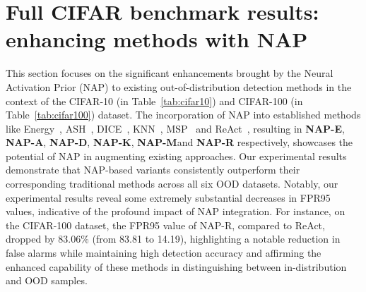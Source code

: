 \section{Full CIFAR benchmark results: enhancing methods with NAP}
\label{appendix:cifar}
This section focuses on the significant enhancements brought by the Neural Activation Prior (NAP) to existing out-of-distribution detection methods in the context of the CIFAR-10 (in Table~\ref{tab:cifar10}) and CIFAR-100 (in Table~\ref{tab:cifar100}) dataset. The incorporation of NAP into established methods like Energy~\cite{liu2020energy}, ASH~\cite{djurisic2022extremely}, DICE~\cite{sun2022dice}, KNN~\cite{sun2022knn}, MSP~\cite{hendrycks2016msp} and ReAct~\cite{sun2021react}, resulting in \textbf{NAP-E}, \textbf{NAP-A}, \textbf{NAP-D}, \textbf{NAP-K}, \textbf{NAP-M}and \textbf{NAP-R} respectively, showcases the potential of NAP in augmenting existing approaches.
Our experimental results demonstrate that NAP-based variants consistently outperform their corresponding traditional methods across all six OOD datasets. Notably, our experimental results reveal some extremely substantial decreases in FPR95 values, indicative of the profound impact of NAP integration. For instance, on the CIFAR-100 dataset, the FPR95 value of NAP-R, compared to ReAct, dropped by 83.06\% (from 83.81 to 14.19), highlighting a notable reduction in false alarms while maintaining high detection accuracy and affirming the enhanced capability of these methods in distinguishing between in-distribution and OOD samples.

